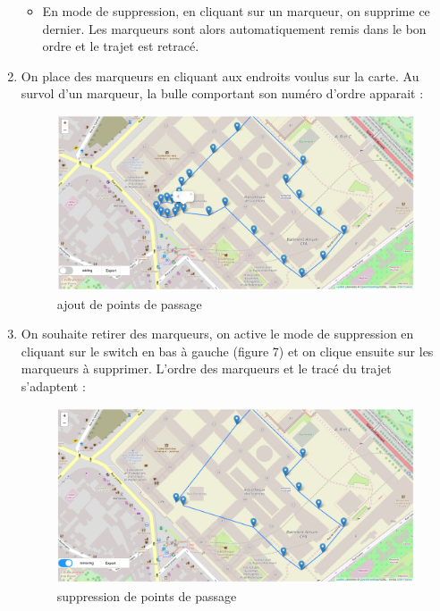 \documentclass{article}
\begin{document}
\begin{enumerate}
\begin{itemize}
 	\item En mode de suppression, en cliquant sur un marqueur, on supprime ce dernier. Les marqueurs sont alors automatiquement remis dans le bon ordre et le trajet est retracé.\\
	\end{itemize}
    \medbreak
   	\item On place des marqueurs en cliquant aux endroits voulus sur la carte. Au survol d'un marqueur, la bulle comportant son numéro d'ordre apparait :\\
 	\begin{figure}[!h]
 	\begin{center}
 	\includegraphics[scale=0.42]{capt3.PNG}
 	\caption{ajout de points de passage}
 	\end{center}
 	\end{figure}
 	\newpage
  	\item On souhaite retirer des marqueurs, on active le mode de suppression en cliquant sur le switch en bas à gauche (figure 7) et on clique ensuite sur les marqueurs à supprimer. L'ordre des marqueurs et le tracé du trajet s'adaptent :\\
	\begin{figure}[!h]
 	\begin{center}
 	\includegraphics[scale=0.42]{capt5.PNG}
 	\caption{suppression de points de passage}
 	\end{center}
 	\end{figure}


\end{enumerate}
\end{document}
